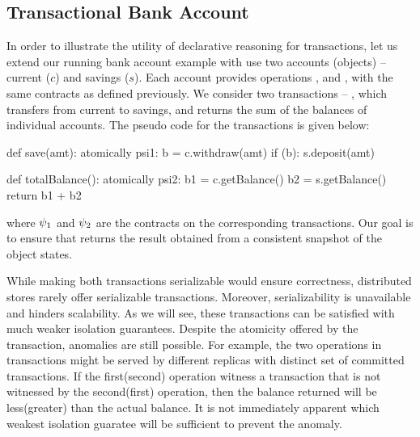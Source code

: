 \subsection{Transactional Bank Account}

In order to illustrate the utility of declarative reasoning for transactions,
let us extend our running bank account example with use two accounts (objects)
-- current ($c$) and savings ($s$). Each account provides operations
,  and , with the same contracts as
defined previously. We consider two transactions -- , which
transfers  from current to savings, and  returns
the sum of the balances of individual accounts. The pseudo code for the
transactions is given below:

\noindent \begin{minipage}[t]{0.5\columnwidth}
\begin{codepython}
def save(amt):
  atomically psi1:
    b = c.withdraw(amt)
    if (b): s.deposit(amt)
\end{codepython}
\end{minipage}
\begin{minipage}[t]{0.5\columnwidth}
\begin{codepython}
def totalBalance():
  atomically psi2:
    b1 = c.getBalance()
    b2 = s.getBalance()
    return b1 + b2
\end{codepython}
\end{minipage}

\noindent where $\psi_1$ and $\psi_2$ are the contracts on the corresponding
transactions. Our goal is to ensure that  returns the result
obtained from a consistent snapshot of the object states.

While making both transactions serializable would ensure correctness,
distributed stores rarely offer serializable transactions. Moreover,
serializability is unavailable and hinders scalability. As we will see, these
transactions can be satisfied with much weaker isolation guarantees. Despite
the atomicity offered by the transaction, anomalies are still possible. For
example, the two  operations in  transactions
might be served by different replicas with distinct set of committed 
transactions. If the first(second)  operation witness a
 transaction that is not witnessed by the second(first)
 operation, then the balance returned will be less(greater) than
the actual balance. It is not immediately apparent which weakest isolation
guaratee will be sufficient to prevent the anomaly.

